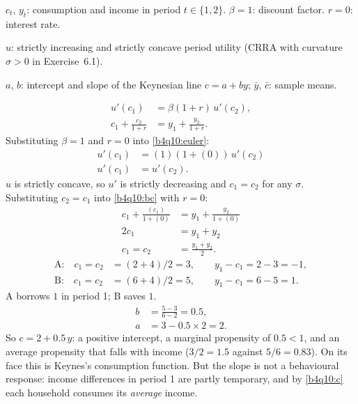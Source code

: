 \begin{sol}
\begin{notacao}
\item $c_t$, $y_t$: consumption and income in period $t\in\{1,2\}$. $\beta=1$: discount factor. $r=0$: interest rate.
\item $u$: strictly increasing and strictly concave period utility (CRRA with curvature $\sigma>0$ in Exercise~6.1).
\item $a$, $b$: intercept and slope of the Keynesian line $c=a+by$; $\bar y$, $\bar c$: sample means.
\end{notacao}
\begin{align}
u'(c_1)&=\beta(1+r)\,u'(c_2), \label{b4q10:euler}\\
c_1+\frac{c_2}{1+r}&=y_1+\frac{y_2}{1+r}. \label{b4q10:bc}
\end{align}
Substituting $\beta=1$ and $r=0$ into \eqref{b4q10:euler}:
\begin{align*}
u'(c_1)&=(1)(1+(0))\,u'(c_2)\\
u'(c_1)&=u'(c_2).
\end{align*}
$u$ is strictly concave, so $u'$ is strictly decreasing and
$c_1=c_2$ for any $\sigma$. Substituting $c_2=c_1$ into \eqref{b4q10:bc} with $r=0$:
\begin{align}
c_1+\frac{(c_1)}{1+(0)}&=y_1+\frac{y_2}{1+(0)}\nonumber\\
2c_1&=y_1+y_2\nonumber\\
c_1=c_2&=\frac{y_1+y_2}{2}. \label{b4q10:c}
\end{align}
\begin{align*}
\text{A:}\quad c_1=c_2&=(2+4)/2=3,\qquad y_1-c_1=2-3=-1,\\
\text{B:}\quad c_1=c_2&=(6+4)/2=5,\qquad y_1-c_1=6-5=1 .
\end{align*}
A borrows $1$ in period 1; B saves $1$.
\begin{align*}
b&=\frac{5-3}{6-2}=0.5,\\
a&=3-0.5\times2=2 .
\end{align*}
So $c=2+0.5\,y$: a positive intercept, a marginal propensity of $0.5<1$, and an average propensity that falls with income
($3/2=1.5$ against $5/6=0.83$). On its face this is Keynes's consumption function. But the slope is not a behavioural response:
income differences in period 1 are partly temporary, and by \eqref{b4q10:c} each household consumes its \emph{average} income.

\end{sol}
